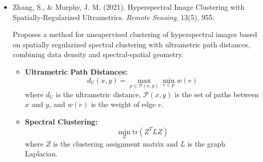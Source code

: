 \documentclass[10pt,svgnames,fragile]{beamer}
\begin{document}
\begin{frame}{}
\tiny
\begin{itemize}

\item Zhang, S., \& Murphy, J. M. (2021). Hyperspectral Image Clustering with Spatially-Regularized Ultrametrics. \textit{Remote Sensing}, 13(5), 955. \href{https://doi.org/10.3390/rs13050955}{\color{blue}{DOI: 10.3390/rs13050955}} \cite{zhangHyperspectralImageClustering2021}

{\color{gray}Proposes a method for unsupervised clustering of hyperspectral images based on spatially regularized spectral clustering with ultrametric path distances, combining data density and spectral-spatial geometry.}
\begin{itemize} \tiny
    \item \textbf{Ultrametric Path Distances:}
    \[
    d_U(x, y) = \max_{p \in \mathcal{P}(x,y)} \min_{e \in p} w(e)
    \]
    where \(d_U\) is the ultrametric distance, \(\mathcal{P}(x,y)\) is the set of paths between \(x\) and \(y\), and \(w(e)\) is the weight of edge \(e\).
    \item \textbf{Spectral Clustering:}
    \[
    \min_{Z} \text{tr}(Z^T L Z)
    \]
    where \(Z\) is the clustering assignment matrix and \(L\) is the graph Laplacian.
\end{itemize}

\end{itemize}
\end{frame}
\end{document}
